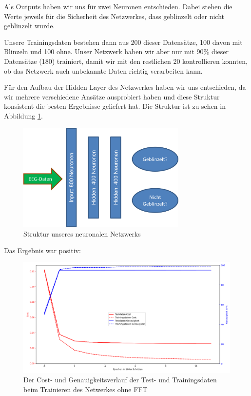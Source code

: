 \documentclass{scrartcl}
\begin{document}
	Als Outputs haben wir uns für zwei Neuronen entschieden. Dabei stehen die Werte jeweils für die Sicherheit des Netzwerkes, dass geblinzelt oder nicht geblinzelt wurde.

	Unsere Trainingsdaten bestehen dann aus 200 dieser Datensätze, 100 davon mit Blinzeln und 100 ohne. Unser Netzwerk haben wir aber nur mit 90\% dieser Datensätze (180) trainiert, damit wir mit den restlichen 20 kontrollieren konnten, ob das Netzwerk auch unbekannte Daten richtig verarbeiten kann.

	Für den Aufbau der Hidden Layer des Netzwerkes haben wir uns entschieden, da wir mehrere verschiedene Ansätze ausprobiert haben und diese Struktur konsistent die besten Ergebnisse geliefert hat. Die Struktur ist zu sehen in Abbildung \ref{NetzStruktur}.

	\begin{figure}[h!]
		\includegraphics[width=0.75\textwidth]{pictures/netzwerk-struktur.png}
		\caption{Struktur unseres neuronalen Netzwerks}
		\label{NetzStruktur}
	\end{figure}

	Das Ergebnis war positiv:

	\begin{figure}[h!]
		\includegraphics[width=\textwidth]{pictures/training-nofft.png}
		\caption{Der Cost- und Genauigkeitsverlauf der Test- und Trainingsdaten beim Trainieren des Netwerkes ohne FFT}
		\label{training-nofft}
	\end{figure}
\end{document}
